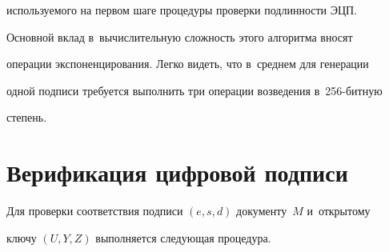 используемого на первом шаге процедуры проверки подлинности ЭЦП. 


Основной вклад в~вычислительную сложность этого алгоритма вносят 


операции экспоненцирования. Легко видеть, что в~среднем для генерации 


одной подписи требуется выполнить три операции возведения в~256-бит\-ную 


степень.





\section{Верификация цифровой подписи}





   Для проверки соответствия подписи $(e,s,d)$ документу~$M$ и~открытому 


ключу $(U,Y,Z)$ выполняется сле\-ду\-ющая процедура.


